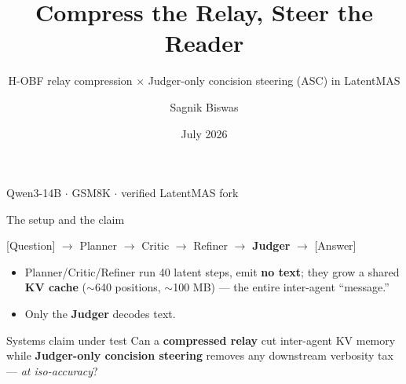 \documentclass{beamer}
\title[Compress the Relay, Steer the Reader]{Compress the Relay, Steer the Reader}
\subtitle{H-OBF relay compression $\times$ Judger-only concision steering (ASC) in LatentMAS}
\author{Sagnik Biswas}
\date{July 2026}
\begin{document}
\begin{frame}
    \titlepage
    \vspace{-0.8cm}
    \begin{center}\small Qwen3-14B $\cdot$ GSM8K $\cdot$ verified LatentMAS fork\end{center}
\end{frame}

\begin{frame}{The setup and the claim}
    \begin{center}
        [Question] $\rightarrow$ Planner $\rightarrow$ Critic $\rightarrow$ Refiner $\rightarrow$ \textbf{Judger} $\rightarrow$ [Answer]
    \end{center}
    \vspace{0.2cm}
    \begin{itemize}
        \item Planner/Critic/Refiner run 40 latent steps, emit \textbf{no text}; they grow a shared \textbf{KV cache} ($\sim$640 positions, $\sim$100 MB) --- the entire inter-agent ``message.''
        \item Only the \textbf{Judger} decodes text.
    \end{itemize}
    \vspace{0.2cm}
    \begin{block}{Systems claim under test}
        Can a \textbf{compressed relay} cut inter-agent KV memory while \textbf{Judger-only concision steering} removes any downstream verbosity tax --- \emph{at iso-accuracy}?
    \end{block}
\end{frame}
\end{document}
